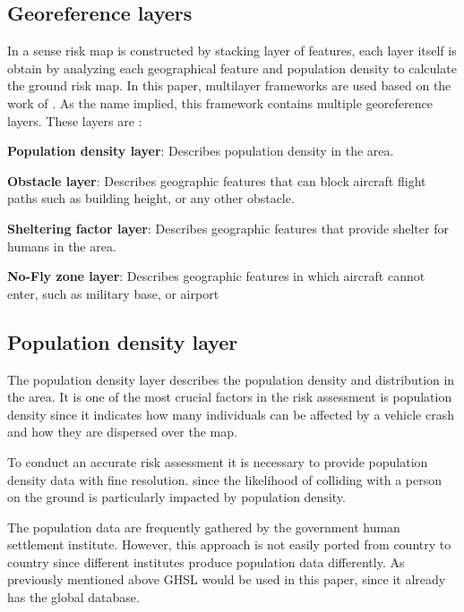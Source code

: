 \documentclass[12pt]{report}
\begin{document}
        \subsection{Georeference layers}
            In a sense risk map is constructed by stacking layer of features, each layer itself is obtain by analyzing
            each geographical feature and population density to calculate the ground risk map. In this paper, multilayer
            frameworks are used based on the work of \cite{primatesta_ground_2020}. As the name implied, this framework contains multiple
            georeference layers. These layers are :
                \begin{myitemize}
                    \item \textbf{Population density layer}: Describes population density in the area.
                    \item \textbf{Obstacle layer}: Describes geographic features that can block aircraft flight paths
                    such as building height, or any other obstacle.
                    \item \textbf{Sheltering factor layer}: Describes geographic features that provide shelter for
                    humans in the area.
                    \item \textbf{No-Fly zone layer}: Describes geographic features in which aircraft cannot enter, such
                    as military base, or airport
                \end{myitemize}

        \subsection{Population density layer}
            The population density layer describes the population density and distribution in the area. It is one of the
            most crucial factors in the risk assessment is population density since it indicates how many individuals
            can be affected by a vehicle crash and how they are dispersed over the map.

            To conduct an accurate risk assessment it is necessary to provide population density data with fine
            resolution. since the likelihood of colliding with a person on the ground is particularly impacted by
            population density.

            The population data are frequently gathered by the government human settlement institute. However, this
            approach is not easily ported from country to country since different institutes produce population data
            differently. As previously mentioned above GHSL would be used in this paper, since it already has the global
            database.
\end{document}
